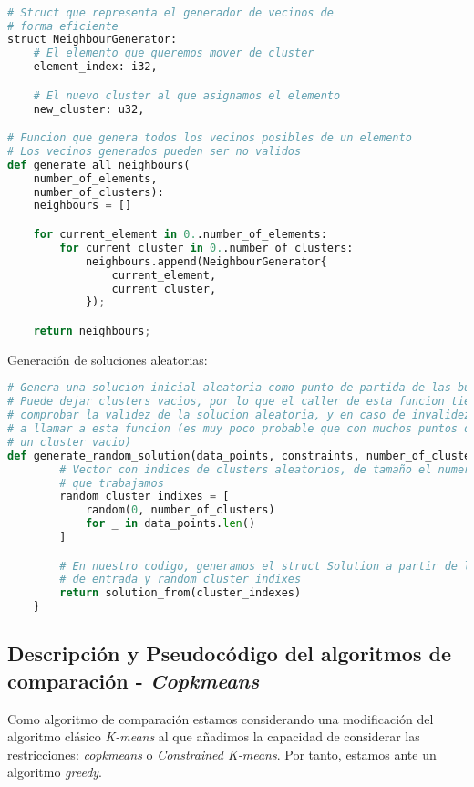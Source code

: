 \documentclass[11pt]{article}
\begin{document}
\begin{lstlisting}[language=Python, style=Boxed]

# Struct que representa el generador de vecinos de
# forma eficiente
struct NeighbourGenerator:
    # El elemento que queremos mover de cluster
    element_index: i32,

    # El nuevo cluster al que asignamos el elemento
    new_cluster: u32,

# Funcion que genera todos los vecinos posibles de un elemento
# Los vecinos generados pueden ser no validos
def generate_all_neighbours(
    number_of_elements,
    number_of_clusters):
    neighbours = []

    for current_element in 0..number_of_elements:
        for current_cluster in 0..number_of_clusters:
            neighbours.append(NeighbourGenerator{
                current_element,
                current_cluster,
            });

    return neighbours;
\end{lstlisting}

Generación de soluciones aleatorias:

\begin{lstlisting}[language=Python, style=Boxed]
# Genera una solucion inicial aleatoria como punto de partida de las busquedas
# Puede dejar clusters vacios, por lo que el caller de esta funcion tiene que
# comprobar la validez de la solucion aleatoria, y en caso de invalidez, volver
# a llamar a esta funcion (es muy poco probable que con muchos puntos dejemos
# un cluster vacio)
def generate_random_solution(data_points, constraints, number_of_clusters):
        # Vector con indices de clusters aleatorios, de tamaño el numero de puntos
        # que trabajamos
        random_cluster_indixes = [
            random(0, number_of_clusters)
            for _ in data_points.len()
        ]

        # En nuestro codigo, generamos el struct Solution a partir de los parametros
        # de entrada y random_cluster_indixes
        return solution_from(cluster_indexes)
    }
    \end{lstlisting}


    \pagebreak

    \subsection{Descripción y Pseudocódigo del algoritmos de comparación - \emph{Copkmeans}}

    Como algoritmo de comparación estamos considerando una modificación del algoritmo clásico \emph{K-means} al que añadimos la capacidad de considerar las restricciones: \emph{copkmeans} o \emph{Constrained K-means}. Por tanto, estamos ante un algoritmo \emph{greedy}.
\end{document}
